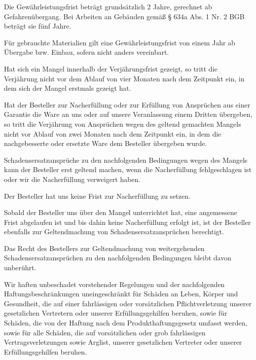 \documentclass[fontsize=12pt,parskip=half]{scrartcl}
\begin{document}
\begin{contract}
\Clause[title={Gewährleistung}]

Die Gewährleistungsfrist beträgt grundsätzlich 2 Jahre, gerechnet ab Gefahrenübergang. Bei Arbeiten an Gebäuden gemäß § 634a Abs. 1 Nr. 2 BGB beträgt sie fünf Jahre. 

Für gebrauchte Materialien gilt eine Gewährleistungsfrist von einem Jahr ab Übergabe bzw. Einbau, sofern nicht anders vereinbart.

Hat sich ein Mangel innerhalb der Verjährungsfrist gezeigt, so tritt die Verjährung nicht vor dem Ablauf von vier Monaten nach dem Zeitpunkt ein, in dem sich der Mangel erstmals gezeigt hat. 

Hat der Besteller zur Nacherfüllung oder zur Erfüllung von Ansprüchen aus einer Garantie die Ware an uns oder auf unsere Veranlassung einem Dritten übergeben, so tritt die Verjährung von Ansprüchen wegen des geltend gemachten Mangels nicht vor Ablauf von zwei Monaten nach dem Zeitpunkt ein, in dem die nachgebesserte oder ersetzte Ware dem Besteller übergeben wurde. 

\Clause[title={Schadensersatz}]

Schadensersatzansprüche zu den nachfolgenden Bedingungen wegen des Mangels kann der Besteller erst geltend machen, wenn die Nacherfüllung fehlgeschlagen ist oder wir die Nacherfüllung verweigert haben. 

Der Besteller hat uns keine Frist zur Nacherfüllung zu setzen. 

Sobald der Besteller uns über den Mangel unterrichtet hat, eine angemessene Frist abgelaufen ist und bis dahin keine Nacherfüllung erfolgt ist, ist der Besteller ebenfalls zur Geltendmachung von Schadensersatzansprüchen berechtigt. 

Das Recht des Bestellers zur Geltendmachung von weitergehenden Schadensersatzansprüchen zu den nachfolgenden Bedingungen bleibt davon unberührt.

\Clause[title={Haftung}]

Wir haften unbeschadet vorstehender Regelungen und der nachfolgenden Haftungsbeschränkungen uneingeschränkt für Schäden an Leben, Körper und Gesundheit, die auf einer fahrlässigen oder vorsätzlichen Pflichtverletzung unserer gesetzlichen Vertretern oder unserer Erfüllungsgehilfen beruhen, sowie für Schäden, die von der Haftung nach dem Produkthaftungsgesetz umfasst werden, sowie für alle Schäden, die auf vorsätzlichen oder grob fahrlässigen Vertragsverletzungen sowie Arglist, unserer gesetzlichen Vertreter oder unserer Erfüllungsgehilfen beruhen. 


\end{contract}
\end{document}
